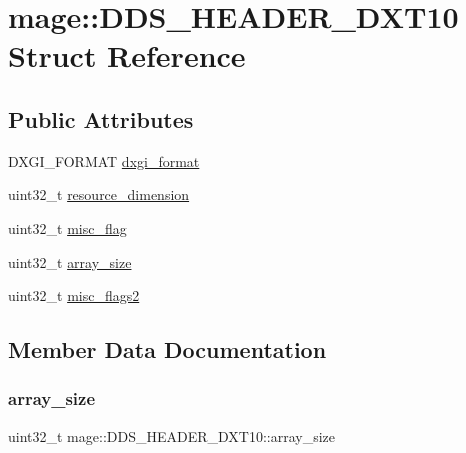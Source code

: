 \hypertarget{structmage_1_1_d_d_s___h_e_a_d_e_r___d_x_t10}{}\section{mage\+:\+:D\+D\+S\+\_\+\+H\+E\+A\+D\+E\+R\+\_\+\+D\+X\+T10 Struct Reference}
\label{structmage_1_1_d_d_s___h_e_a_d_e_r___d_x_t10}
\subsection*{Public Attributes}
\begin{DoxyCompactItemize}
\item 
D\+X\+G\+I\+\_\+\+F\+O\+R\+M\+AT \hyperlink{structmage_1_1_d_d_s___h_e_a_d_e_r___d_x_t10_a06df28f4738161963f81349e9bc8b09d}{dxgi\+\_\+format}
\item 
uint32\+\_\+t \hyperlink{structmage_1_1_d_d_s___h_e_a_d_e_r___d_x_t10_aeb430923620730b48962c8267dd296ea}{resource\+\_\+dimension}
\item 
uint32\+\_\+t \hyperlink{structmage_1_1_d_d_s___h_e_a_d_e_r___d_x_t10_a8253c8f0f1e93b3512e1d92760d1f5d3}{misc\+\_\+flag}
\item 
uint32\+\_\+t \hyperlink{structmage_1_1_d_d_s___h_e_a_d_e_r___d_x_t10_a51faaa2b9971004c1c32b5b597ef82ee}{array\+\_\+size}
\item 
uint32\+\_\+t \hyperlink{structmage_1_1_d_d_s___h_e_a_d_e_r___d_x_t10_a36301f029c8424fd9adf2b8a2fcd55c9}{misc\+\_\+flags2}
\end{DoxyCompactItemize}


\subsection{Member Data Documentation}
\hypertarget{structmage_1_1_d_d_s___h_e_a_d_e_r___d_x_t10_a51faaa2b9971004c1c32b5b597ef82ee}{}\label{structmage_1_1_d_d_s___h_e_a_d_e_r___d_x_t10_a51faaa2b9971004c1c32b5b597ef82ee} 
\subsubsection{\texorpdfstring{array\+\_\+size}{array\_size}}
{\footnotesize\ttfamily uint32\+\_\+t mage\+::\+D\+D\+S\+\_\+\+H\+E\+A\+D\+E\+R\+\_\+\+D\+X\+T10\+::array\+\_\+size}

